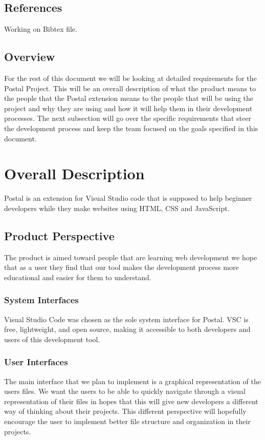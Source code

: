 \documentclass[letterpaper,10pt,titlepage,draftclsnofoot,onecolumn] {IEEEtran}
\begin{document}
\subsection{References}
Working on Bibtex file.

\subsection{Overview}
For the rest of this document we will be looking at detailed requirements for the Postal Project. 
This will be an overall description of what the product means to the people that the Postal extension means to the people that will be using the project and why they are using and how it will help them in their development processes. The next subsection will go over the specific requirements that steer the development process and keep the team focused on the goals specified in this document.   

\section{Overall Description}
Postal is an extension for Visual Studio code  that is supposed to help beginner developers while they make websites using HTML, CSS and JavaScript.

\subsection{Product Perspective}
The product is aimed toward people that are learning web development we hope that as a user they find that our tool makes the development process more educational and easier for them to understand.

\subsubsection{System Interfaces}
Visual Studio Code was chosen as the sole system interface for Postal. VSC is free, lightweight, and open source, making it accessible to both developers and users of this development tool.

\subsubsection{User Interfaces}
The main interface that we plan to implement is a graphical representation of the users files. 
We want the users to be able to quickly navigate through a visual representation of their files in hopes that this will give new developers a different way of thinking about their projects.
This different perspective will hopefully encourage the user to implement better file structure and organization in their projects.
\end{document}
